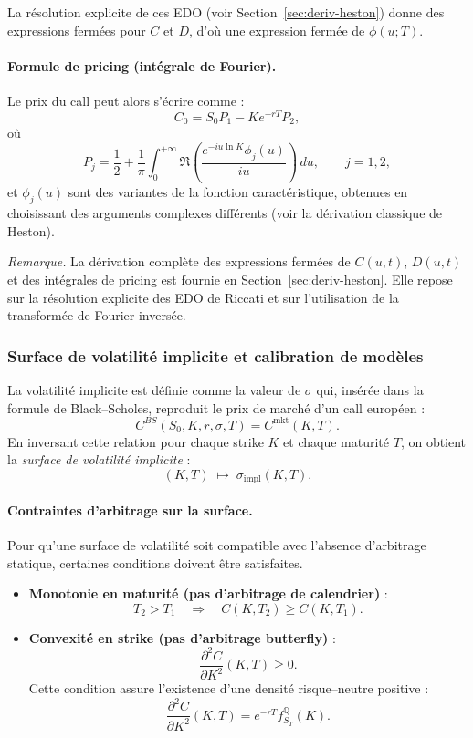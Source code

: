 \documentclass[11pt,a4paper]{article}
\newcommand{\1}{\mathbf{1}}
\begin{document}
La r\'esolution explicite de ces EDO (voir Section~\ref{sec:deriv-heston}) donne des
expressions ferm\'ees pour $C$ et $D$, d'o\`u une expression ferm\'ee de $\phi(u;T)$.

\paragraph{Formule de pricing (int\'egrale de Fourier).}

Le prix du call peut alors s'\'ecrire comme :
\[
C_0 = S_0 P_1 - K e^{-rT} P_2,
\]
o\`u
\[
P_j = \frac12 + \frac{1}{\pi} \int_0^{+\infty}
\Re\left(
\frac{e^{-iu \ln K} \phi_j(u)}{iu}
\right)\, du,
\qquad j=1,2,
\]
et $\phi_j(u)$ sont des variantes de la fonction caract\'eristique, obtenues en choisissant
des arguments complexes diff\'erents (voir la d\'erivation classique de Heston).

\medskip

\noindent
\textit{Remarque.} La d\'erivation compl\`ete des expressions ferm\'ees de $C(u,t)$, $D(u,t)$
et des int\'egrales de pricing est fournie en Section~\ref{sec:deriv-heston}.
Elle repose sur la r\'esolution explicite des EDO de Riccati et sur l'utilisation
de la transform\'ee de Fourier invers\'ee.


\subsubsection{Surface de volatilit\'e implicite et calibration de mod\`eles}

La volatilité implicite est définie comme la valeur de $\sigma$ qui, insérée dans
la formule de Black--Scholes, reproduit le prix de marché d'un call europ\'een :
\[
C^{BS}(S_0,K,r,\sigma,T) = C^{\mathrm{mkt}}(K,T).
\]
En inversant cette relation pour chaque strike $K$ et chaque maturité $T$, on
obtient la \emph{surface de volatilité implicite} :
\[
(K,T) \;\longmapsto\; \sigma_{\mathrm{impl}}(K,T).
\]

\paragraph{Contraintes d'arbitrage sur la surface.}

Pour qu'une surface de volatilité soit compatible avec l'absence d'arbitrage
statique, certaines conditions doivent être satisfaites.

\begin{itemize}
  \item \textbf{Monotonie en maturité (pas d'arbitrage de calendrier)} :
  \[
  T_2 > T_1 \quad\Rightarrow\quad C(K,T_2) \ge C(K,T_1).
  \]

  \item \textbf{Convexité en strike (pas d'arbitrage butterfly)} :
  \[
  \frac{\partial^2 C}{\partial K^2}(K,T) \ge 0.
  \]
  Cette condition assure l'existence d'une densité risque--neutre positive :
  \[
  \frac{\partial^2 C}{\partial K^2}(K,T)
  = e^{-rT} f^{\mathbb{Q}}_{S_T}(K).
  \]
\end{itemize}
\end{document}
